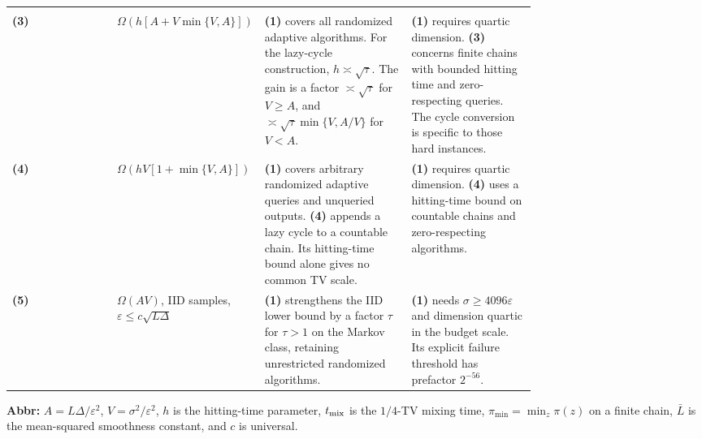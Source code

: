 \begin{table}[tp]
\begin{threeparttable}
\begin{tabularx}{\linewidth}{@{}>{\raggedright\arraybackslash}p{0.20\linewidth}>{\raggedright\arraybackslash}p{0.27\linewidth}>{\raggedright\arraybackslash}p{0.28\linewidth}>{\raggedright\arraybackslash}X@{}}
\midrule[1.2pt]
\multicolumn{4}{@{}l}{\textit{Prior lower bounds (necessary budgets)}}\\
\textbf{(3)} \citep[Thm.~3.1, smooth case]{NEURIPS2025_1cdbce34} & $\Omega(h[A+V\min\{V,A\}])$ & \textbf{(1)} covers all randomized adaptive algorithms. For the lazy-cycle construction, $h\asymp\sqrt{\tau}$. The gain is a factor $\asymp\sqrt{\tau}$ for $V\ge A$, and $\asymp\sqrt{\tau}\min\{V,A/V\}$ for $V<A$. & \textbf{(1)} requires quartic dimension. \textbf{(3)} concerns finite chains with bounded hitting time and zero-respecting queries. The cycle conversion is specific to those hard instances. \\
\midrule
\textbf{(4)} \citep[Thm.~3.1]{pmlr-v267-sun25u} & $\Omega(hV[1+\min\{V,A\}])$ & \textbf{(1)} covers arbitrary randomized adaptive queries and unqueried outputs. \textbf{(4)} appends a lazy cycle to a countable chain. Its hitting-time bound alone gives no common TV scale. & \textbf{(1)} requires quartic dimension. \textbf{(4)} uses a hitting-time bound on countable chains and zero-respecting algorithms. \\
\midrule
\textbf{(5)} \citep[Thm.~3, Eq.~(23)]{hnnlArjevani2023V2} & $\Omega(AV)$, IID samples, $\varepsilon\le c\sqrt{L\Delta}$ & \textbf{(1)} strengthens the IID lower bound by a factor $\tau$ for $\tau>1$ on the Markov class, retaining unrestricted randomized algorithms. & \textbf{(1)} needs $\sigma\ge4096\varepsilon$ and dimension quartic in the budget scale. Its explicit failure threshold has prefactor $2^{-56}$. \\
\bottomrule
\end{tabularx}
\begin{tablenotes}[flushleft]\footnotesize
\item[] \textbf{Abbr:} $A=L\Delta/\varepsilon^2$, $V=\sigma^2/\varepsilon^2$, $h$ is the hitting-time parameter, $t_{\rm mix}$ is the $1/4$-TV mixing time, $\pi_{\min}=\min_z\pi(z)$ on a finite chain, $\bar L$ is the mean-squared smoothness constant, and $c$ is universal.
\end{tablenotes}
\end{threeparttable}
\end{table}
\clearpage
